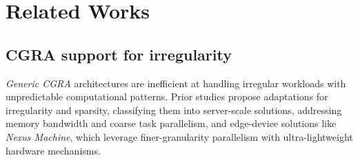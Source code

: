 \section{Related Works}
\subsection{CGRA support for irregularity} 
\label{section: related_works}
\begin{comment}
\textit{Generic CGRA} architectures exhibit inherent inefficiencies in handling irregular workloads with unpredictable computational patterns. Previous studies have explored various approaches to adapt CGRAs for handling irregularity and sparsity. We classify prior works into those targeting server scale, and hence are faced with memory bandwidth challenges and much coarser task granularity parallelism; vs. the edge devices that the \textit{Nexus Machine} targets which require much finer granularity parallelism to be leveraged with ultra-lightweight hardware mechanisms.
\end{comment}

\textit{Generic CGRA} architectures are inefficient at handling irregular workloads with unpredictable computational patterns. Prior studies propose adaptations for irregularity and sparsity, classifying them into server-scale solutions, addressing memory bandwidth and coarse task parallelism, and edge-device solutions like \textit{Nexus Machine}, which leverage finer-granularity parallelism with ultra-lightweight hardware mechanisms.

